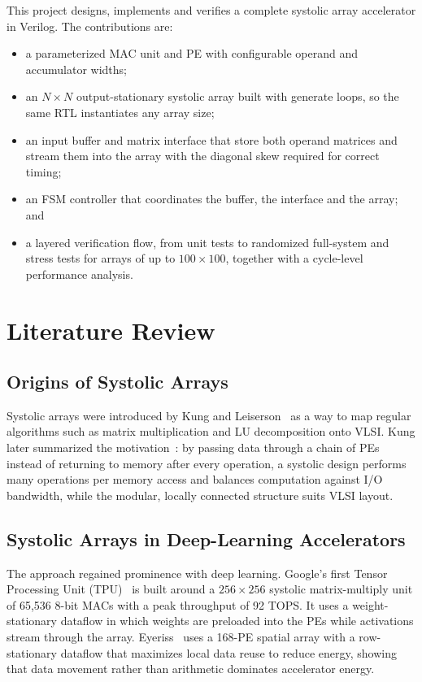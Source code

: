 \documentclass[conference]{IEEEtran}
\begin{document}
This project designs, implements and verifies a complete systolic array accelerator in
Verilog. The contributions are:
\begin{itemize}
\item a parameterized MAC unit and PE with configurable operand and accumulator widths;
\item an $N\times N$ output-stationary systolic array built with generate loops, so the
same RTL instantiates any array size;
\item an input buffer and matrix interface that store both operand matrices and stream them
into the array with the diagonal skew required for correct timing;
\item an FSM controller that coordinates the buffer, the interface and the array; and
\item a layered verification flow, from unit tests to randomized full-system and stress
tests for arrays of up to $100\times100$, together with a cycle-level performance analysis.
\end{itemize}

\section{Literature Review}
\subsection{Origins of Systolic Arrays}
Systolic arrays were introduced by Kung and Leiserson~\cite{kung1979} as a way to map
regular algorithms such as matrix multiplication and LU decomposition onto VLSI. Kung later
summarized the motivation~\cite{kung1982}: by passing data through a chain of PEs instead of
returning to memory after every operation, a systolic design performs many operations per
memory access and balances computation against I/O bandwidth, while the modular, locally
connected structure suits VLSI layout.

\subsection{Systolic Arrays in Deep-Learning Accelerators}
The approach regained prominence with deep learning. Google's first Tensor Processing Unit
(TPU)~\cite{jouppi2017} is built around a $256\times256$ systolic matrix-multiply unit of 65,536
8-bit MACs with a peak throughput of 92 TOPS. It uses a weight-stationary dataflow in which
weights are preloaded into the PEs while activations stream through the array. Eyeriss~\cite{chen2016,chen2017}
uses a 168-PE spatial array with a row-stationary dataflow that maximizes local data reuse to
reduce energy, showing that data movement rather than arithmetic dominates accelerator
energy.
\end{document}
